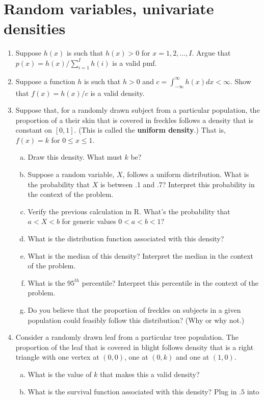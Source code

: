 \documentclass[12pt]{article}
\begin{document}
\section{Random variables, univariate densities}
\begin{enumerate}[1.]
\item Suppose $h(x)$ is such that $h(x) > 0$ for
  $x=1,2,\ldots,I$. Argue that $ p(x) = h(x) / \sum_{i=1}^I h(i) $ is
  a valid pmf.
\item Suppose a function $h$ is such that $h>0$ and $c =
  \int_{-\infty}^\infty h(x) dx < \infty$.  Show that $f(x) = h(x) /
  c$ is a valid density.
\item Suppose that, for a randomly drawn subject from a particular
  population, the proportion of a their skin that is covered in
  freckles follows a density that is constant on $[0,1]$. (This is
  called the {\bf uniform density}.) That is, $f(x) = k$ for $0\leq x
  \leq 1$.
  \begin{enumerate}[a.]
  \item Draw this density. What must $k$ be?
  \item Suppose a random variable, $X$, follows a uniform
    distribution. What is the probability that $X$ is between .1 and
    .7? Interpret
    this probability in the context of the problem.
  \item Verify the previous calculation in R. What's the probability that $a < X < b$ for
    generic values $0 < a < b < 1$?
  \item What is the distribution function associated with this density?
  \item What is the median of this density? Interpret the median in the context of the problem.
  \item What is the $95^{th}$ percentile? Interpret this percentile in the context of the problem.
  \item Do you believe that the proportion of freckles on subjects in a
    given population could feasibly follow this distribution? (Why or
    why not.)
  \end{enumerate}
\item  Consider a randomly drawn leaf from a particular tree
  population. The proportion of the leaf that is covered in blight
  follows density that is a right triangle with one vertex at $(0,0)$,
  one at $(0, k)$ and one at $(1,0)$.
  \begin{enumerate}[a.]
  \item What is the value of $k$ that makes this a valid density?
  \item What is the survival function associated with this density? Plug in $.5$ into

\end{enumerate}
\end{enumerate}
\end{document}
